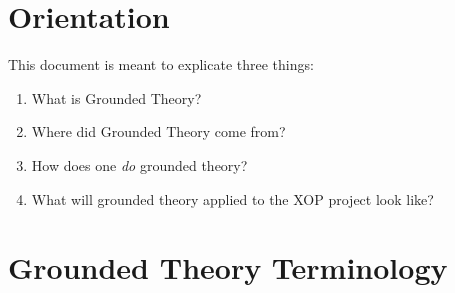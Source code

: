 \documentclass[10pt, letterpaper]{article}
\begin{document}
\section*{Orientation}
\label{sec:orge919eb8}
This document is meant to explicate three things:
\begin{enumerate}
\item What is Grounded Theory?
\item Where did Grounded Theory come from?
\item How does one \emph{do} grounded theory?
\item What will grounded theory applied to the XOP project look like?
\end{enumerate}

\section*{Grounded Theory Terminology}
\label{sec:org303e8e1}
\end{document}

